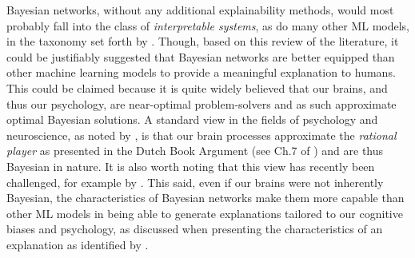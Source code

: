 Bayesian networks, without any additional explainability methods, would most probably fall into the class of \textit{interpretable systems}, as do many other ML models, in the taxonomy set forth by \citet{Doran2018}.
Though, based on this review of the literature, it could be justifiably suggested that Bayesian networks are better equipped than other machine learning models to provide a meaningful explanation to humans.
This could be claimed because it is quite widely believed that our brains, and thus our psychology, are near-optimal problem-solvers and as such approximate optimal Bayesian solutions.
A standard view in the fields of psychology and neuroscience, as noted by \citet{Bowers2012}, is that our brain processes approximate the \textit{rational player} as presented in the Dutch Book Argument (see Ch.7 of \citet{anand2009handbook}) and are thus Bayesian in nature.
It is also worth noting that this view has recently been challenged, for example by \citet{Bowers2012}.
This said, even if our brains were not inherently Bayesian, the characteristics of Bayesian networks make them more capable than other ML models in being able to generate explanations tailored to our cognitive biases and psychology, as discussed when presenting the characteristics of an explanation as identified by \citet{miller2018explanation}.